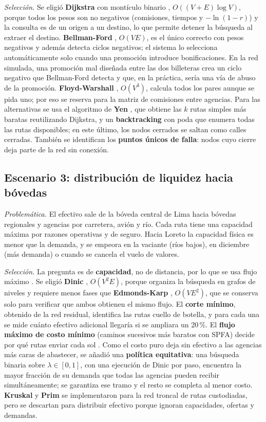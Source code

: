 \documentclass[11pt,a4paper]{article}
\begin{document}
\textit{Selección.} Se eligió \textbf{Dijkstra} con montículo binario \citep{dijkstra1959}, $O((V+E)\log V)$, porque
todos los pesos son no negativos (comisiones, tiempos y $-\ln(1-r)$) y la consulta es de un origen a un destino, lo que
permite detener la búsqueda al extraer el destino. \textbf{Bellman-Ford} \citep{bellman1958}, $O(VE)$, es el único
correcto con pesos negativos y además detecta ciclos negativos; el sistema lo selecciona automáticamente solo cuando
una promoción introduce bonificaciones. En la red simulada, una promoción mal diseñada entre las dos billeteras
crea un ciclo negativo que Bellman-Ford detecta y que, en la práctica, sería una vía de abuso de la promoción.
\textbf{Floyd-Warshall} \citep{cormen2022}, $O(V^3)$, calcula todos los pares aunque se pida uno; por eso se reserva
para la matriz de comisiones entre agencias. Para las alternativas se usa el algoritmo de \textbf{Yen}
\citep{yen1971}, que obtiene las $k$ rutas simples más baratas reutilizando Dijkstra, y un \textbf{backtracking} con
poda que enumera todas las rutas disponibles; en este último, los nodos cerrados se saltan como calles cerradas.
También se identifican los \textbf{puntos únicos de falla}: nodos cuyo cierre deja parte de la red sin conexión.

\subsection{Escenario 3: distribución de liquidez hacia bóvedas}
\textit{Problemática.} El efectivo sale de la bóveda central de Lima hacia bóvedas regionales y agencias por
carretera, avión y río. Cada ruta tiene una capacidad máxima por razones operativas y de seguro. Hacia Loreto la
capacidad física es menor que la demanda, y se empeora en la vaciante (ríos bajos), en diciembre (más demanda)
o cuando se cancela el vuelo de valores.

\textit{Selección.} La pregunta es de \textbf{capacidad}, no de distancia, por lo que se usa flujo máximo
\citep{ahuja1993}. Se eligió \textbf{Dinic} \citep{dinic1970}, $O(V^2E)$, porque organiza la búsqueda en grafos de
niveles y requiere menos fases que \textbf{Edmonds-Karp} \citep{edmonds1972}, $O(VE^2)$, que se conserva solo para
verificar que ambos obtienen el mismo flujo. El \textbf{corte mínimo}, obtenido de la red residual, identifica las
rutas cuello de botella, y para cada una se mide cuánto efectivo adicional llegaría si se ampliara un 20\,\%. El
\textbf{flujo máximo de costo mínimo} (caminos sucesivos más baratos con SPFA) decide por qué rutas enviar cada sol
\citep{ahuja1993}. Como el costo puro deja sin efectivo a las agencias más caras de abastecer, se añadió una
\textbf{política equitativa}: una búsqueda binaria sobre $\lambda\in[0,1]$, con una ejecución de Dinic por paso,
encuentra la mayor fracción de su demanda que todas las agencias pueden recibir simultáneamente; se garantiza ese
tramo y el resto se completa al menor costo. \textbf{Kruskal} y \textbf{Prim} \citep{cormen2022}
se implementaron para la red troncal de rutas custodiadas, pero se descartan para distribuir efectivo porque ignoran
capacidades, ofertas y demandas.
\end{document}
